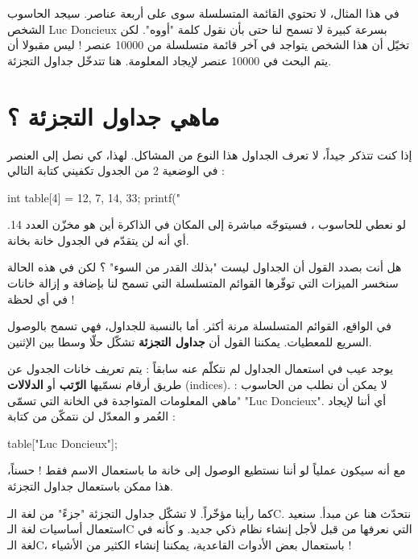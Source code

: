في هذا المثال، لا تحتوي القائمة المتسلسلة سوى على أربعة عناصر. سيجد الحاسوب الشخص 
\textenglish{Luc Doncieux}
بسرعة كبيرة لا تسمح لنا حتى بأن نقول كلمة "أووه". لكن تخيّل أن هذا الشخص يتواجد في آخر قائمة متسلسلة من 10000 عنصر ! ليس مقبولا أن يتم البحث في 10000 عنصر لإيجاد المعلومة. هنا تتدخّل جداول التجزئة.

\section{ماهي جداول التجزئة ؟}

إذا كنت تتذكر جيداً، لا تعرف الجداول هذا النوع من المشاكل. لهذا، كي نصل إلى العنصر في الوضعية 2 من الجدول تكفيني كتابة التالي :

\begin{Csource}
int table[4] = {12, 7, 14, 33};
printf("%
\end{Csource}

لو نعطي للحاسوب
،
فسيتوجّه مباشرة إلى المكان في الذاكرة أين هو مخزّن العدد 14. أي أنه لن يتقدّم في الجدول خانة بخانة.

\begin{question}
هل أنت بصدد القول أن الجداول ليست "بذلك القدر من السوء" ؟ لكن في هذه الحالة سنخسر الميزات التي توفّرها القوائم المتسلسلة التي تسمح لنا بإضافة و إزالة خانات في أي لحظة !
\end{question}

في الواقع، القوائم المتسلسلة مرنة أكثر. أما بالنسبة للجداول، فهي تسمح بالوصول السريع للمعطيات. يمكننا القول أن 
\textbf{جداول التجزئة}
تشكّل حلّا وسطا بين الإثنين.

يوجد عيب في استعمال الجداول لم نتكلّم عنه سابقاً : يتم تعريف خانات الجدول عن طريق أرقام نسمّيها 
\textbf{الرّتب}
أو
\textbf{الدلالات}
(\textenglish{indices}).
لا يمكن أن نطلب من الحاسوب : "ماهي المعلومات المتواجدة في الخانة التي تسمّى
"\textenglish{Luc Doncieux}".
أي أننا لإيجاد العُمر و المعدّل لن نتمكّن من كتابة :

\begin{Csource}
table["Luc Doncieux"];
\end{Csource}

مع أنه سيكون عملياً لو أننا نستطيع الوصول إلى خانة ما باستعمال الاسم فقط ! حسناً، هذا ممكن باستعمال جداول التجزئة.

\begin{information}
كما رأينا مؤخّراً. لا تشكّل جداول التجزئة "جزءً" من لغة الـ\textenglish{C}.
نتحدّث هنا عن مبدأ. سنعيد استعمال أساسيات لغة الـ\textenglish{C}
التي نعرفها من قبل لأجل إنشاء نظام ذكي جديد. و كأنه في لغة الـ\textenglish{C}،
باستعمال بعض الأدوات القاعدية، يمكننا إنشاء الكثير من الأشياء !
\end{information}

